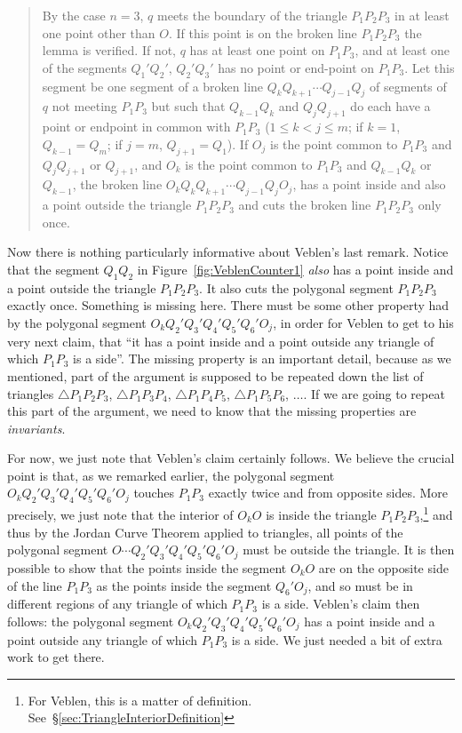 \begin{quote}By the case $n=3$, $q$ meets the boundary of the triangle $P_1P_2P_3$ in at least one point other than $O$. If this point is on the broken line $P_1P_2P_3$ the lemma is verified. If not, $q$ has at least one point on $P_1P_3$, and at least one of the segments $Q_1'Q_2'$, $Q_2'Q_3'$ has no point or end-point on $P_1P_3$. Let this segment be one segment of a broken line $Q_kQ_{k+1}\cdots Q_{j-1}Q_j$ of segments of $q$ not meeting $P_1P_3$ but such that $Q_{k-1}Q_k$ and $Q_jQ_{j+1}$ do each have a point or endpoint in common with $P_1P_3$ ($1 \leq k < j \leq m$; if $k = 1$, $Q_{k-1} = Q_m$; if $j = m$, $Q_{j+1} = Q_1$). If $O_j$ is the point common to $P_1P_3$ and $Q_jQ_{j+1}$ or $Q_{j+1}$, and $O_k$ is the point common to $P_1P_3$ and $Q_{k-1}Q_k$ or $Q_{k-1}$, the broken line $O_kQ_kQ_{k+1}\cdots Q_{j-1}Q_jO_j$, has a point inside and also a point outside the triangle $P_1P_2P_3$ and cuts the broken line $P_1P_2P_3$ only once. \end{quote}

Now there is nothing particularly informative about Veblen's last remark. Notice that the segment $Q_1Q_2$ in Figure~\ref{fig:VeblenCounter1} \emph{also} has a point inside and a point outside the triangle $P_1P_2P_3$. It also cuts the polygonal segment $P_1P_2P_3$ exactly once. Something is missing here. There must be some other property had by the polygonal segment $O_kQ_2'Q_3'Q_4'Q_5'Q_6'O_j$, in order for Veblen to get to his very next claim, that ``it has a point inside and a point outside any triangle of which $P_1P_3$ is a side''. The missing property is an important detail, because as we mentioned, part of the argument is supposed to be repeated down the list of triangles $\triangle P_1P_2P_3$, $\triangle P_1P_3P_4$, $\triangle P_1P_4P_5$, $\triangle P_1P_5P_6$, $\ldots$. If we are going to repeat this part of the argument, we need to know that the missing properties are \emph{invariants}.

For now, we just note that Veblen's claim certainly follows. We believe the crucial point is that, as we remarked earlier, the polygonal segment $O_kQ_2'Q_3'Q_4'Q_5'Q_6'O_j$ touches $P_1P_3$ exactly twice and from opposite sides. More precisely, we just note that the interior of $O_kO$ is inside the triangle $P_1P_2P_3$,\footnote{For Veblen, this is a matter of definition. See~\S\ref{sec:TriangleInteriorDefinition}} and thus by the Jordan Curve Theorem applied to triangles, all points of the polygonal segment $O\cdots Q_2'Q_3'Q_4'Q_5'Q_6'O_j$ must be outside the triangle. It is then possible to show that the points inside the segment $O_kO$ are on the opposite side of the line $P_1P_3$ as the points inside the segment $Q_6'O_j$, and so must be in different regions of any triangle of which $P_1P_3$ is a side. Veblen's claim then follows: the polygonal segment $O_kQ_2'Q_3'Q_4'Q_5'Q_6'O_j$ has a point inside and a point outside any triangle of which $P_1P_3$ is a side. We just needed a bit of extra work to get there.

